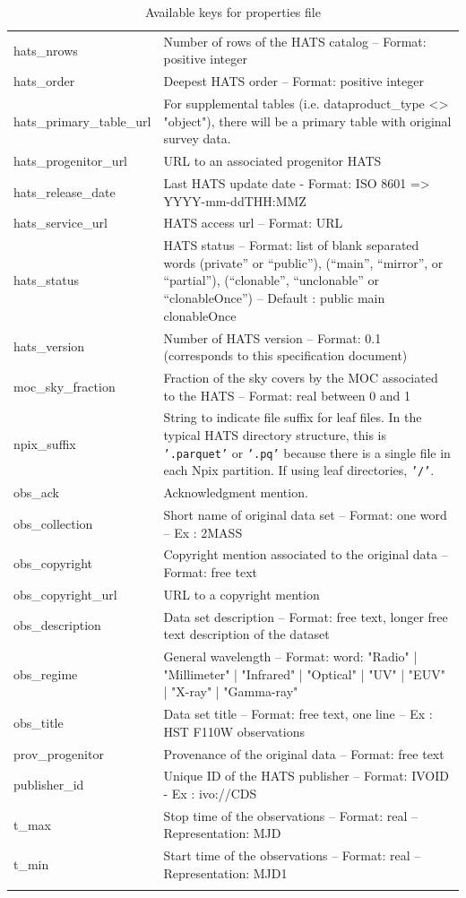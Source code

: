 \documentclass[11pt,a4paper]{ivoa}
\begin{document}
\begin{longtable}[h!]{D{0.33\textwidth} D{0.67\textwidth}}
hats\_nrows &Number of rows of the HATS catalog – Format: positive integer \\
hats\_order &Deepest HATS order – Format: positive integer \\
hats\_primary\_table\_url &For supplemental tables (i.e. dataproduct\_type <> "object"), there will be a primary table with original survey data. \\
hats\_progenitor\_url &URL to an associated progenitor HATS \\
hats\_release\_date &Last HATS update date - Format: ISO 8601 => YYYY-mm-ddTHH:MMZ \\
hats\_service\_url &HATS access url – Format: URL \\
hats\_status &HATS status – Format: list of blank separated words (private” or “public”), (“main”, “mirror”, or “partial”), (“clonable”, “unclonable” or “clonableOnce”) – Default : public main clonableOnce \\
hats\_version &Number of HATS version – Format: 0.1 (corresponds to this specification document) \\
moc\_sky\_fraction &Fraction of the sky covers by the MOC associated to the HATS – Format: real between 0 and 1 \\
npix\_suffix & String to indicate file suffix for leaf files. In the typical HATS directory structure, this is \texttt{'.parquet'} or \texttt{'.pq'} because there is a single file in each Npix partition. If using leaf directories, \texttt{'/'}. \\
obs\_ack &Acknowledgment mention. \\
obs\_collection &Short name of original data set – Format: one word – Ex : 2MASS \\
obs\_copyright &Copyright mention associated to the original data – Format: free text \\
obs\_copyright\_url &URL to a copyright mention \\
obs\_description &Data set description – Format: free text, longer free text description of the dataset \\
obs\_regime &General wavelength – Format: word: "Radio" | "Millimeter" | "Infrared" | "Optical" | "UV" | "EUV" | "X-ray" | "Gamma-ray" \\
obs\_title &Data set title – Format: free text, one line – Ex : HST F110W observations \\
prov\_progenitor &Provenance of the original data – Format: free text \\
publisher\_id &Unique ID of the HATS publisher – Format: IVOID - Ex : ivo://CDS \\
t\_max &Stop time of the observations – Format: real – Representation: MJD \\
t\_min &Start time of the observations – Format: real – Representation: MJD1 \\
\sptablerule    
\caption{Available keys for properties file}
\label{tab:properties}
\end{longtable}
\end{document}

